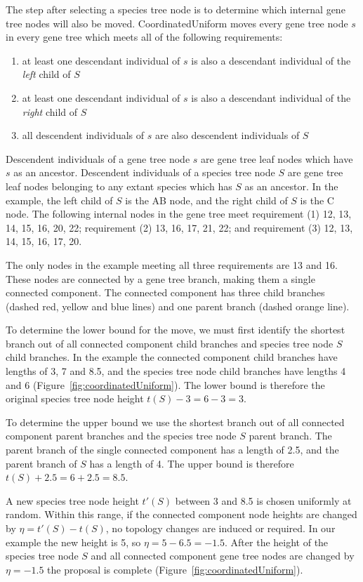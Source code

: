 \documentclass[12pt]{article}
\begin{document}
The step after selecting a species tree node is to determine which internal
gene tree nodes will also be moved. CoordinatedUniform moves every gene tree
node $s$ in every gene tree which meets all of the following requirements:

\begin{enumerate}
\item at least one descendant individual of $s$ is also a
descendant individual of the \textit{left} child of $S$
\item at least one descendant individual of $s$ is also a
descendant individual of the \textit{right} child of $S$
\item all descendent individuals of $s$ are also
descendent individuals of $S$
\end{enumerate}

Descendent individuals of a gene tree node $s$ are gene tree leaf nodes which
have $s$ as an ancestor. Descendent individuals of a species tree node $S$ are
gene tree leaf nodes belonging to any extant species which has $S$ as an
ancestor. In the example, the left child of $S$ is the AB node, and the right
child of $S$ is the C node. The following internal nodes in the gene tree meet
requirement (1) 12, 13, 14, 15, 16, 20, 22; requirement (2) 13, 16, 17, 21,
22; and requirement (3) 12, 13, 14, 15, 16, 17, 20.

The only nodes in the example meeting all three requirements are 13 and 16.
These nodes are connected by a gene tree branch, making them a single
connected component. The connected component has three child branches (dashed
red, yellow and blue lines) and one parent branch (dashed orange line).

To determine the lower bound for the move, we must first identify the shortest
branch out of all connected component child branches and species tree node $S$
child branches. In the example the connected component child branches have
lengths of 3, 7 and 8.5, and the species tree node child branches have lengths 4
and 6 (Figure~\ref{fig:coordinatedUniform}). The lower bound is therefore the
original species tree node height $t(S) - 3 = 6 - 3 = 3$.

To determine the upper bound we use the shortest branch out of all connected
component parent branches and the species tree node $S$ parent branch. The
parent branch of the single connected component has a length of 2.5, and
the parent branch of $S$ has a length of 4. The upper bound is therefore
$t(S) + 2.5 = 6 + 2.5 = 8.5$.

A new species tree node height $t'(S)$ between 3 and 8.5 is chosen uniformly
at random. Within this range, if the connected component node heights are
changed by $\eta = t'(S) - t(S)$, no topology changes are induced or required.
In our example the new height is 5, so $\eta = 5 - 6.5 = -1.5$. After the
height of the species tree node $S$ and all connected component gene tree
nodes are changed by $\eta = -1.5$ the proposal is complete
(Figure~\ref{fig:coordinatedUniform}).
\end{document}
